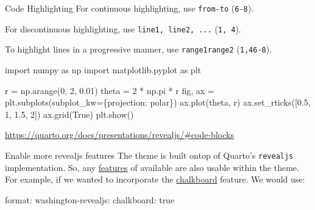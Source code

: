 \documentclass[
  10pt,
  ignorenonframetext,
]{beamer}
\newenvironment{Shaded}{\begin{snugshade}}{\end{snugshade}}
\newcommand{\AttributeTok}[1]{\textcolor[rgb]{0.40,0.45,0.13}{#1}}
\newcommand{\CharTok}[1]{\textcolor[rgb]{0.13,0.47,0.30}{#1}}
\newcommand{\DecValTok}[1]{\textcolor[rgb]{0.68,0.00,0.00}{#1}}
\newcommand{\FloatTok}[1]{\textcolor[rgb]{0.68,0.00,0.00}{#1}}
\newcommand{\FunctionTok}[1]{\textcolor[rgb]{0.28,0.35,0.67}{#1}}
\newcommand{\ImportTok}[1]{\textcolor[rgb]{0.00,0.46,0.62}{#1}}
\newcommand{\KeywordTok}[1]{\textcolor[rgb]{0.00,0.23,0.31}{#1}}
\newcommand{\NormalTok}[1]{\textcolor[rgb]{0.00,0.23,0.31}{#1}}
\newcommand{\OperatorTok}[1]{\textcolor[rgb]{0.37,0.37,0.37}{#1}}
\newcommand{\StringTok}[1]{\textcolor[rgb]{0.13,0.47,0.30}{#1}}
\newcommand{\VariableTok}[1]{\textcolor[rgb]{0.07,0.07,0.07}{#1}}
\begin{document}
\begin{frame}[fragile]{Code Highlighting}
\protect\hypertarget{code-highlighting}{}
For continuous highlighting, use \texttt{from-to} (\texttt{6-8}).

For discontinuous highlighting, use \texttt{line1,\ line2,\ ...}
(\texttt{1,\ 4}).

To highlight lines in a progressive manner, use
\texttt{range1\textbar{}range2} (\texttt{\textbar{}1,4\textbar{}6-8}).

\begin{Shaded}
\begin{Highlighting}[numbers=left,,]
\ImportTok{import}\NormalTok{ numpy }\ImportTok{as}\NormalTok{ np}
\ImportTok{import}\NormalTok{ matplotlib.pyplot }\ImportTok{as}\NormalTok{ plt}

\NormalTok{r }\OperatorTok{=}\NormalTok{ np.arange(}\DecValTok{0}\NormalTok{, }\DecValTok{2}\NormalTok{, }\FloatTok{0.01}\NormalTok{)}
\NormalTok{theta }\OperatorTok{=} \DecValTok{2} \OperatorTok{*}\NormalTok{ np.pi }\OperatorTok{*}\NormalTok{ r}
\NormalTok{fig, ax }\OperatorTok{=}\NormalTok{ plt.subplots(subplot\_kw}\OperatorTok{=}\NormalTok{\{}\StringTok{\textquotesingle{}projection\textquotesingle{}}\NormalTok{: }\StringTok{\textquotesingle{}polar\textquotesingle{}}\NormalTok{\})}
\NormalTok{ax.plot(theta, r)}
\NormalTok{ax.set\_rticks([}\FloatTok{0.5}\NormalTok{, }\DecValTok{1}\NormalTok{, }\FloatTok{1.5}\NormalTok{, }\DecValTok{2}\NormalTok{])}
\NormalTok{ax.grid(}\VariableTok{True}\NormalTok{)}
\NormalTok{plt.show()}
\end{Highlighting}
\end{Shaded}

\url{https://quarto.org/docs/presentations/revealjs/\#code-blocks}
\end{frame}

\begin{frame}[fragile]{Enable more revealjs features}
\protect\hypertarget{enable-more-revealjs-features}{}
The theme is built ontop of Quarto's \texttt{revealjs} implementation.
So, any \href{https://quarto.org/docs/presentations/revealjs/}{features}
of available are also usable within the theme. For example, if we wanted
to incorporate the
\href{https://quarto.org/docs/presentations/revealjs/presenting.html\#chalkboard}{chalkboard}
feature. We would use:

\begin{Shaded}
\begin{Highlighting}[]
\FunctionTok{format}\KeywordTok{:}
\AttributeTok{  }\FunctionTok{washington{-}revealjs}\KeywordTok{:}\AttributeTok{ }
\AttributeTok{    }\FunctionTok{chalkboard}\KeywordTok{:}\AttributeTok{ }\CharTok{true}
\end{Highlighting}
\end{Shaded}
\end{frame}
\end{document}
